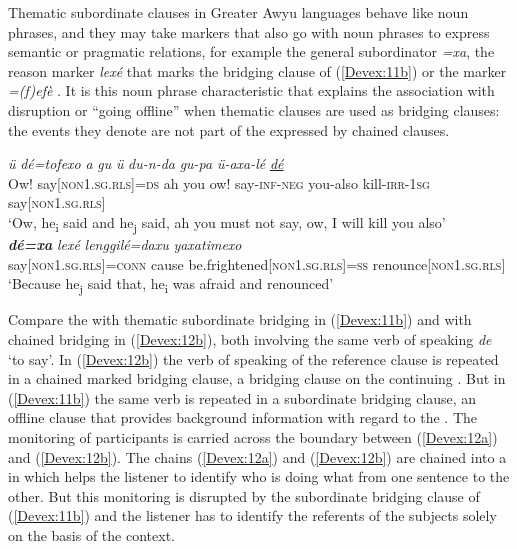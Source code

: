 \documentclass[output=paper]{LSP/langsci}
\begin{document}
Thematic subordinate clauses in Greater Awyu languages behave like noun phrases, and they may take markers that also go with noun phrases to  express semantic or pragmatic relations, for example the general subordinator \textit{=xa}, the  reason marker \textit{lexé} that marks the bridging clause of (\ref{Devex:11b}) or the  marker \textit{=(f)efè} . It is this noun phrase characteristic that explains the association with disruption or ``going offline'' when thematic clauses are used as bridging clauses: the events they denote are not part of the  expressed by chained clauses.

\begin{exe}
\ex \label{Devex:11ab}
\begin{xlist}
\ex \label{Devex:11a}		
\gll \textit{ü} \textit{dé=tofexo} \textit{a} \textit{gu} \textit{ü}	\textit{du-n-da} \textit{gu-pa} \textit{ü-axa-lé} \underline{\textit{dé}}\\
Ow!	say\textsc{[non1.sg.rls]=ds} ah you ow! say-\textsc{inf-neg} you-also kill-\textsc{irr-1sg} say\textsc{[non1.sg.rls]}\\
\glt `Ow, he\textsubscript{i} said and he\textsubscript{j} said, ah you must not say, ow, I will kill you also'\\

\ex \label{Devex:11b}		
\gll \textbf{\textit{dé=xa}} \textit{lexé} \textit{lenggilé=daxu} \textit{yaxatimexo}\\
say\textsc{[non1.sg.rls}]=\textsc{conn} cause be.frightened[\textsc{non1.sg.rls}]=\textsc{ss} renounce[\textsc{non1.sg.rls}]\\
\glt `Because he\textsubscript{j} said that, he\textsubscript{i} was afraid and renounced'\\
\end{xlist}
\end{exe}

Compare the  with thematic subordinate bridging in (\ref{Devex:11b}) and with chained bridging in (\ref{Devex:12b}), both involving the same verb of speaking \textit{de} `to say'. In (\ref{Devex:12b}) the verb of speaking of the reference clause is repeated in a chained  marked bridging clause, a bridging clause on the continuing . But in (\ref{Devex:11b}) the same verb is repeated in a subordinate bridging clause, an offline clause that provides background information with regard to the . The  monitoring of participants is carried across the boundary between (\ref{Devex:12a}) and (\ref{Devex:12b}). The chains (\ref{Devex:12a}) and (\ref{Devex:12b}) are chained into a  in which  helps the listener to identify who is doing what from one sentence to the other. But this  monitoring is disrupted by the subordinate bridging clause of (\ref{Devex:11b}) and the listener has to identify the referents of the subjects solely on the basis of the context. 
\end{document}
